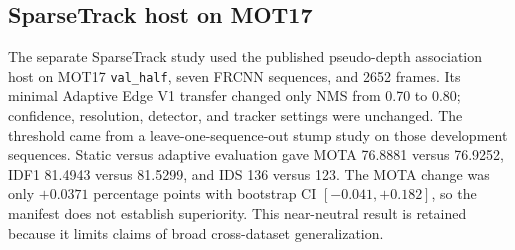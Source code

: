 \subsection{SparseTrack host on MOT17}
The separate SparseTrack study used the published pseudo-depth association
host \cite{liu2025sparsetrack} on MOT17 \texttt{val\_half}, seven FRCNN
sequences, and 2652 frames. Its minimal Adaptive Edge V1 transfer changed only
NMS from 0.70 to 0.80; confidence, resolution, detector, and tracker settings
were unchanged. The threshold came from a leave-one-sequence-out stump study
on those development sequences. Static versus adaptive evaluation gave MOTA
76.8881 versus 76.9252, IDF1 81.4943 versus 81.5299, and IDS 136 versus 123.
The MOTA change was only $+0.0371$ percentage points with bootstrap CI
$[-0.041,+0.182]$, so the manifest does not establish superiority. This
near-neutral result is retained because it limits claims of broad
cross-dataset generalization.
